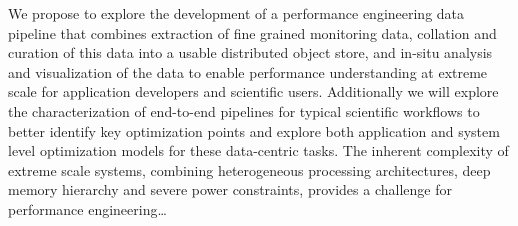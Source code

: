 We propose to explore the development of a performance engineering data pipeline that combines extraction of fine grained monitoring data, collation and curation of this data into a usable distributed object store, and in-situ analysis and visualization of the data to enable performance understanding at extreme scale for application developers and scientific users. Additionally we will explore the characterization of end-to-end pipelines for typical scientific workflows to better identify key optimization points and explore both application and system level optimization models for these data-centric tasks. 
The inherent complexity of extreme scale systems, combining heterogeneous processing architectures, deep memory hierarchy and severe power constraints, provides a challenge for performance engineering…%
